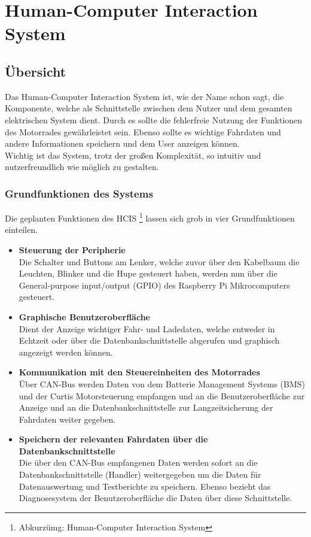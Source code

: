 

\chapter{Human-Computer Interaction System}

\section{Übersicht}
Das Human-Computer Interaction System ist, wie der Name schon sagt, die Komponente, welche als Schnittstelle zwischen dem Nutzer und dem gesamten elektrischen System dient. Durch es sollte die fehlerfreie Nutzung der Funktionen des Motorrades gewährleistet sein. Ebenso sollte es wichtige Fahrdaten und andere Informationen speichern und dem User anzeigen können.\\
Wichtig ist das System, trotz der großen Komplexität, so intuitiv und nutzerfreundlich wie möglich zu gestalten.

\subsection{Grundfunktionen des Systems}
Die geplanten Funktionen des HCIS \footnote{Abkurzümg: Human-Computer Interaction System} lassen sich grob in vier Grundfunktionen einteilen.
\begin{itemize}
	\item \textbf{Steuerung der Peripherie} \medskip\\
	Die Schalter und Buttons am Lenker, welche zuvor über den Kabelbaum die Leuchten, Blinker und die Hupe gesteuert haben, werden nun über die General-purpose input/output (GPIO) des Raspberry Pi Mikrocomputers gesteuert.
	\item \textbf{Graphische Benutzeroberfläche}\medskip\\
Dient der Anzeige wichtiger Fahr- und Ladedaten, welche entweder in Echtzeit oder über die Datenbankschnittstelle abgerufen und graphisch angezeigt werden können.
	\item \textbf{Kommunikation mit den Steuereinheiten des Motorrades} \medskip\\
	Über CAN-Bus werden Daten von dem Batterie Management Systems (BMS) und der Curtis Motorsteuerung empfangen und an die Benutzeroberfläche zur Anzeige und an die Datenbankschnittstelle zur Langzeitsicherung der Fahrdaten weiter gegeben.
	\item \textbf{Speichern der relevanten Fahrdaten über die Datenbankschnittstelle} \medskip\\
Die über den CAN-Bus empfangenen Daten werden sofort an die Datenbankschnittstelle (Handler) weitergegeben um die Daten für Datenauswertung und Testberichte zu speichern. Ebenso bezieht das Diagnosesystem der Benutzeroberfläche die Daten über diese Schnittstelle.
\end{itemize}
\newpage

